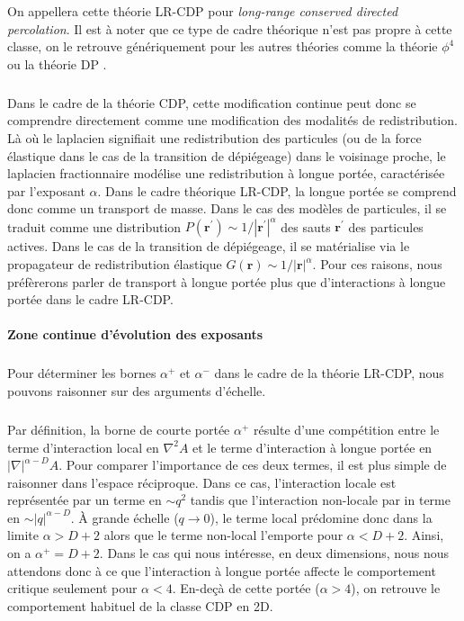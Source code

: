 \noindent On appellera cette théorie LR-CDP pour \textit{long-range conserved directed percolation}. Il est à noter que ce type de cadre théorique n'est pas propre à cette classe, on le retrouve génériquement pour les autres théories comme la théorie $\phi^4$ ou la théorie DP \cite{fisher_critical_1972, hinrichsen_non_equilibrium_2007}.

\subparagraph{}Dans le cadre de la théorie CDP, cette modification continue peut donc se comprendre directement comme une modification des modalités de redistribution. Là où le laplacien signifiait une redistribution des particules (ou de la force élastique dans le cas de la transition de dépiégeage) dans le voisinage proche, le laplacien fractionnaire modélise une redistribution à longue portée, caractérisée par l'exposant $\alpha$. Dans le cadre théorique LR-CDP, la longue portée se comprend donc comme un transport de masse. Dans le cas des modèles de particules, il se traduit comme une distribution $P(\mathbf{r}^\prime)\sim 1/|\mathbf{r}^{\prime}|^{\alpha}$ des sauts $\mathbf{r}^{\prime}$ des particules actives. Dans le cas de la transition de dépiégeage, il se matérialise via le propagateur de redistribution élastique $G(\mathbf{r})\sim 1/|\mathbf{r}|^\alpha$. Pour ces raisons, nous préfèrerons parler de transport à longue portée plus que d'interactions à longue portée dans le cadre LR-CDP.

\paragraph{Zone continue d'évolution des exposants}

\subparagraph{}Pour déterminer les bornes $\alpha^+$ et $\alpha^-$ dans le cadre de la théorie LR-CDP, nous pouvons raisonner sur des arguments d'échelle.

\subparagraph{}Par définition, la borne de courte portée $\alpha^+$ résulte d'une compétition entre le terme d'interaction local en $\nabla^2 A$ et le terme d'interaction à longue portée en $|\nabla|^{\alpha-D} A$. Pour comparer l'importance de ces deux termes, il est plus simple de raisonner dans l'espace réciproque. Dans ce cas, l'interaction locale est représentée par un terme en $\sim q^2$ tandis que l'interaction non-locale par in terme en $\sim |q|^{\alpha-D}$. \`A grande échelle ($q \rightarrow 0$), le terme local prédomine donc dans la limite $\alpha > D+2$ alors que le terme non-local l'emporte pour $\alpha < D+2$. Ainsi, on a $\alpha^+ = D+2$. Dans le cas qui nous intéresse, en deux dimensions, nous nous attendons donc à ce que l'interaction à longue portée affecte le comportement critique seulement pour $\alpha < 4$. En-deçà de cette portée ($\alpha > 4$), on retrouve le comportement habituel de la classe CDP en 2D.

